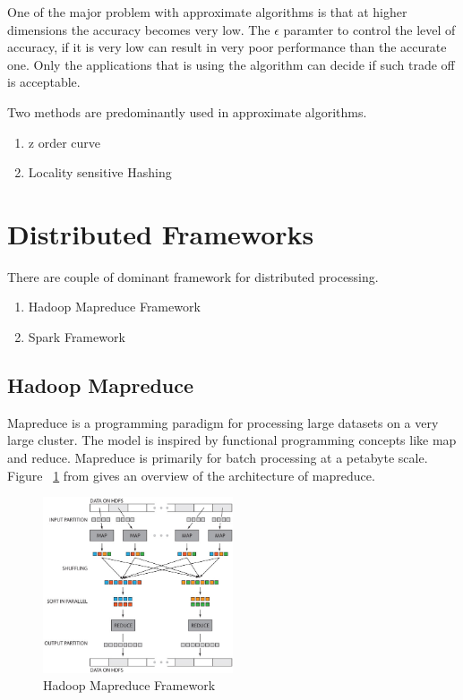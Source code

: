 \documentclass[conference]{IEEEtran}
\begin{document}
\medskip

One of the major problem with approximate algorithms is that at higher
dimensions the accuracy becomes very low. The $\epsilon$ paramter to
control the level of accuracy, if it is very low can result in very
poor performance than the accurate one. Only the applications that is
using the algorithm can decide if such trade off is acceptable.

\medskip

Two methods are predominantly
used in approximate algorithms.
\begin{enumerate}
\item z order curve
\item Locality sensitive Hashing
\end{enumerate}

\bigskip

\section{Distributed Frameworks}

There are couple of dominant framework for distributed processing.
\begin{enumerate}
\item Hadoop Mapreduce Framework \cite{_hadoop_mr}
\item Spark Framework \cite{_apache_spark}
\end{enumerate}

\subsection{Hadoop Mapreduce}
Mapreduce\cite{dean_mapreduce:_2008} is a programming paradigm for processing large datasets on a
very large cluster. The model is inspired by functional programming concepts like
map and reduce. Mapreduce is primarily for batch processing at a
petabyte scale. Figure ~\ref{fig:hadooparch} from \cite{_hadoop_mr_arch} gives an overview of the architecture of
mapreduce.

\begin{figure}[here]
\includegraphics[width=0.5\textwidth]{hadooparch.jpg}
\caption{Hadoop Mapreduce Framework}
\label{fig:hadooparch}
\end{figure}
\end{document}
